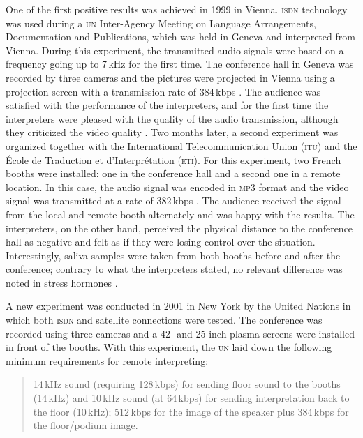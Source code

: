 \documentclass[output=paper]{langsci/langscibook}
\begin{document}
One of the first positive results was achieved in 1999 in Vienna. \textsc{isdn} technology was used during a \textsc{un} Inter-Agency Meeting on Language Arrangements, Documentation and Publications, which was held in Geneva and interpreted from Vienna. During this experiment, the transmitted audio signals were based on a frequency going up to 7\,kHz for the first time. The conference hall in Geneva was recorded by three cameras and the pictures were projected in Vienna using a projection screen with a transmission rate of 384\,kbps \citep[63]{Mouzourakis2006}. The audience was satisfied with the performance of the interpreters, and for the first time the interpreters were pleased with the quality of the audio transmission, although they criticized the video quality \citep[11]{Andres2009}. Two months later, a second experiment was organized together with the International Telecommunication Union (\textsc{itu}) and the École de Traduction et d’Interprétation (\textsc{eti}). For this experiment, two French booths were installed: one in the conference hall and a second one in a remote location. In this case, the audio signal was encoded in \textsc{mp3} format and the video signal was transmitted at a rate of 382\,kbps \citep[63]{Mouzourakis2006}. The audience received the signal from the local and remote booth alternately and was happy with the results. The interpreters, on the other hand, perceived the physical distance to the conference hall as negative and felt as if they were losing control over the situation. Interestingly, saliva samples were taken from both booths before and after the conference; contrary to what the interpreters stated, no relevant difference was noted in stress hormones \citep{Moser-Mercer2003}.

A new experiment was conducted in 2001 in New York by the United Nations in which both \textsc{isdn} and satellite connections were tested. The conference was recorded using three cameras and a 42- and 25-inch plasma screens were installed in front of the booths. With this experiment, the \textsc{un} laid down the following minimum requirements for remote interpreting:

\begin{quote}
14\,kHz sound (requiring 128\,kbps) for sending floor sound to the booths (14\,kHz) and 10\,kHz sound (at 64\,kbps) for sending interpretation back to the floor (10\,kHz); 512\,kbps for the image of the speaker plus 384\,kbps for the floor/podium image. \citep[63]{Mouzourakis2006}
\end{quote}
\end{document}
